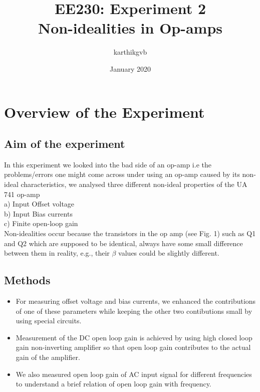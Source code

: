 \documentclass[12pt]{article}
\title{ EE230: Experiment 2 \\
       Non-idealities in Op-amps}
\author{karthikgvb }
\date{January 2020}
\begin{document}
   
   \maketitle

   \section{Overview of the Experiment}
      
      \subsection{Aim of the experiment}
      
      \hspace{2cm} In this experiment we looked into the bad side of an op-amp i.e the problems/errors one might come across under using an op-amp caused by its non-ideal characteristics, we analysed three different non-ideal properties of the UA 741 op-amp 
      \vspace{0.3cm}
      \\ a) Input Offset voltage \\ b) Input Bias currents \\ c) Finite open-loop gain \\
      
      Non-idealities occur because the transistors in the op amp (see Fig. 1) such as Q1 and Q2 which are supposed to be identical, always have some small difference between them in reality, e.g., their $\beta$ values could be slightly different.
      

      
      \subsection{Methods}
      
        \begin{itemize}
           
           \item For measuring offset voltage and bias currents, we enhanced the contributions of one of these parameters while keeping the other two contibutions small by using special circuits.
           
           \item Measurement of the DC open loop gain is achieved by using high closed loop gain non-inverting amplifier so that open loop gain contributes to the actual gain of the amplifier.
           
           \item We also measured open loop gain of AC input signal for different frequencies to understand a brief relation of open loop gain with frequency. 
           
        \end{itemize}
      
\end{document}
